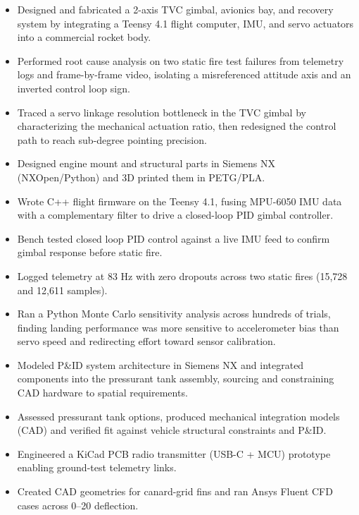 \begin{itemize}
  \item Designed and fabricated a 2-axis TVC gimbal, avionics bay, and recovery system by integrating a Teensy 4.1 flight computer, IMU, and servo actuators into a commercial rocket body.
  \item Performed root cause analysis on two static fire test failures from telemetry logs and frame-by-frame video, isolating a misreferenced attitude axis and an inverted control loop sign.
  \item Traced a servo linkage resolution bottleneck in the TVC gimbal by characterizing the mechanical actuation ratio, then redesigned the control path to reach sub-degree pointing precision.
  \item Designed engine mount and structural parts in Siemens NX (NXOpen/Python) and 3D printed them in PETG/PLA.
  \item Wrote C++ flight firmware on the Teensy 4.1, fusing MPU-6050 IMU data with a complementary filter to drive a closed-loop PID gimbal controller.
  \item Bench tested closed loop PID control against a live IMU feed to confirm gimbal response before static fire.
  \item Logged telemetry at 83 Hz with zero dropouts across two static fires (15,728 and 12,611 samples).
  \item Ran a Python Monte Carlo sensitivity analysis across hundreds of trials, finding landing performance was more sensitive to accelerometer bias than servo speed and redirecting effort toward sensor calibration.
\end{itemize}
\entrygap

\begin{itemize}
  \item Modeled P\&ID system architecture in Siemens NX and integrated components into the pressurant tank assembly, sourcing and constraining CAD hardware to spatial requirements.
  \item Assessed pressurant tank options, produced mechanical integration models (CAD) and verified fit against vehicle structural constraints and P\&ID.
  \item Engineered a KiCad PCB radio transmitter (USB-C + MCU) prototype enabling ground-test telemetry links.
  \item Created CAD geometries for canard-grid fins and ran Ansys Fluent CFD cases across 0--20\textdegree{} deflection.
\end{itemize}
\entrygap

